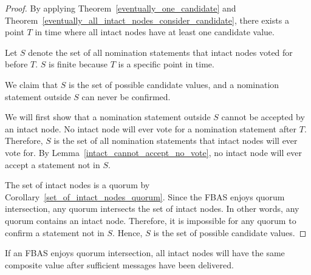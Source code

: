 \begin{proof}
    By applying Theorem~\ref{eventually_one_candidate} and Theorem~\ref{eventually_all_intact_nodes_consider_candidate},
    there exists a point $T$ in time where all intact nodes have at least one candidate value.

    Let $S$ denote the set of all nomination statements that intact nodes voted for before $T$.
    $S$ is finite because $T$ is a specific point in time.

    We claim that $S$ is the set of possible candidate values, and a nomination statement outside $S$ can never be confirmed.

    We will first show that a nomination statement outside $S$ cannot be accepted by an intact node.
    No intact node will ever vote for a nomination statement after $T$.
    Therefore, $S$ is the set of all nomination statements that intact nodes will ever vote for.
    By Lemma~\ref{intact_cannot_accept_no_vote}, no intact node will ever accept a statement not in $S$.

    The set of intact nodes is a quorum by Corollary~\ref{set_of_intact_nodes_quorum}.
    Since the FBAS enjoys quorum intersection, any quorum intersects the set of intact nodes.
    In other words, any quorum contains an intact node.
    Therefore, it is impossible for any quorum to confirm a statement not in $S$.
    Hence, $S$ is the set of possible candidate values.
\end{proof}

\begin{thm}\label{nominiation_protocol_convergence}
    If an FBAS enjoys quorum intersection, all intact nodes will have the same composite value after sufficient messages have been delivered.
\end{thm}


